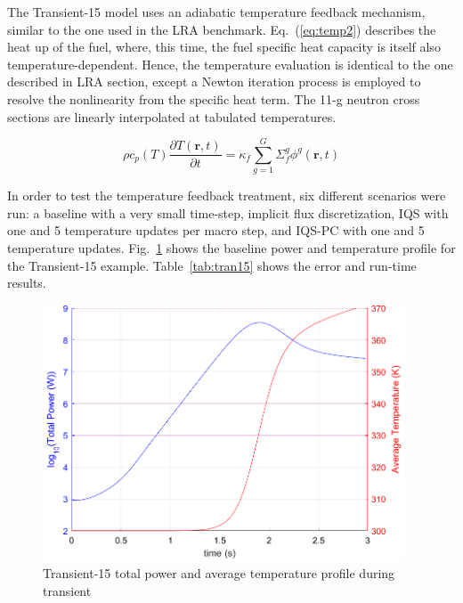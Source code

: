 \documentclass{elsarticle}
\renewcommand{\vec}[1]{\bm{#1}} %
\newcommand{\eqt}[1]{Eq.~(\ref{#1})}                     %
\newcommand{\fig}[1]{Fig.~\ref{#1}}                      %
\newcommand{\tbl}[1]{Table~\ref{#1}}                     %
\newcommand{\iqspc}{IQS-PC\xspace}
\newcommand{\be}{\begin{equation}}
\newcommand{\ee}{\end{equation}}
\begin{document}
The Transient-15 model uses an adiabatic temperature feedback mechanism, similar to the one used in the LRA benchmark.
\eqt{eq:temp2} describes the heat up of the fuel, where, this time, the fuel specific heat capacity is itself also temperature-dependent. Hence, the temperature evaluation is identical to the one described in LRA section, except a Newton iteration process is employed to resolve the nonlinearity from the specific heat term.  The 11-g neutron cross sections are linearly interpolated at tabulated temperatures.

\be
\rho c_p(T) \frac{\partial T(\vec{r},t)}{\partial t} = \kappa_f \sum^G_{g=1}\Sigma_f^g \phi^g(\vec{r},t)
\label{eq:temp2}
\ee



In order to test the temperature feedback treatment, six different scenarios were run: a baseline with a very small time-step, implicit flux discretization, IQS with one and 5 temperature updates per macro step, and \iqspc with one and 5 temperature updates.  \fig{fig:Tran15_profile} shows the baseline power and temperature profile for the Transient-15 example.  \tbl{tab:tran15} shows the error and run-time results.

\begin{figure}[htbp!]
\centering
\includegraphics[height=3in]{figures/Tran15_profile.png}
\caption{Transient-15 total power and average temperature profile during transient}
\label{fig:Tran15_profile}
\end{figure}
\end{document}
